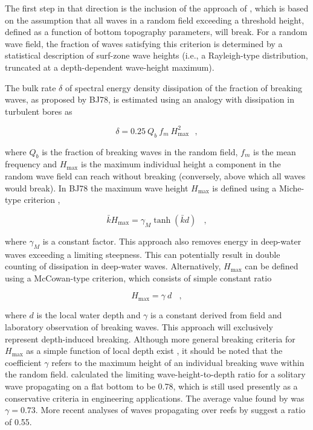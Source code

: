 The first step in that direction is the inclusion of the approach of
\citet[][henceforth denoted as BJ78]{pro:BJ78}, which is based on the
assumption that all waves in a random field exceeding a threshold height,
defined as a function of bottom topography parameters, will break. For a
random wave field, the fraction of waves satisfying this criterion is
determined by a statistical description of surf-zone wave heights (i.e., a
Rayleigh-type distribution, truncated at a depth-dependent wave-height
maximum).

The bulk rate $\delta$ of spectral energy density dissipation of the fraction
of breaking waves, as proposed by BJ78, is estimated using an analogy with
dissipation in turbulent bores as


\begin{equation}
\delta = 0.25 \: Q_b \: f_m \: H_{\max}^2 \:\:\: , \label{eq:BJ78_base}
\end{equation}

\noindent
where $Q_b$ is the fraction of breaking waves in the random field, $f_m$ is
the mean frequency and $H_{\max}$ is the maximum individual height a component
in the random wave field can reach without breaking (conversely, above which
all waves would break). In BJ78 the maximum wave height $H_{\max}$ is defined
using a Miche-type criterion \citep{art:Miche44},


\begin{equation}
\bar{k} H_{\max} = \gamma_M \tanh ( \bar{k} d )
\:\:\:\ , \label{eq:BJ78_Miche}
\end{equation}

\noindent
where $\gamma_M$ is a constant factor. This approach also removes energy in
deep-water waves exceeding a limiting steepness. This can potentially result
in double counting of dissipation in deep-water waves. Alternatively,
$H_{\max}$ can be defined using a McCowan-type criterion, which consists of
simple constant ratio


\begin{equation}
H_{\max} = \gamma \: d \:\:\:\ , \label{eq:BJ78_McC}
\end{equation}

\noindent
where $d$ is the local water depth and $\gamma$ is a constant derived from
field and laboratory observation of breaking waves. This approach will
exclusively represent depth-induced breaking.  Although more general breaking
criteria for $H_{\max}$ as a simple function of local depth exist
\citep[e.g.,][]{art:TG83}, it should be noted that the coefficient $\gamma$
refers to the maximum height of an individual breaking wave within the random
field. \cite{art:M1894} calculated the limiting wave-height-to-depth ratio for
a solitary wave propagating on a flat bottom to be 0.78, which is still used
presently as a conservative criteria in engineering applications. The average
value found by \cite{pro:BJ78} was $\gamma = 0.73$. More recent analyses of
waves propagating over reefs by \cite{art:Nel94, art:Nel97} suggest a ratio of
0.55.

